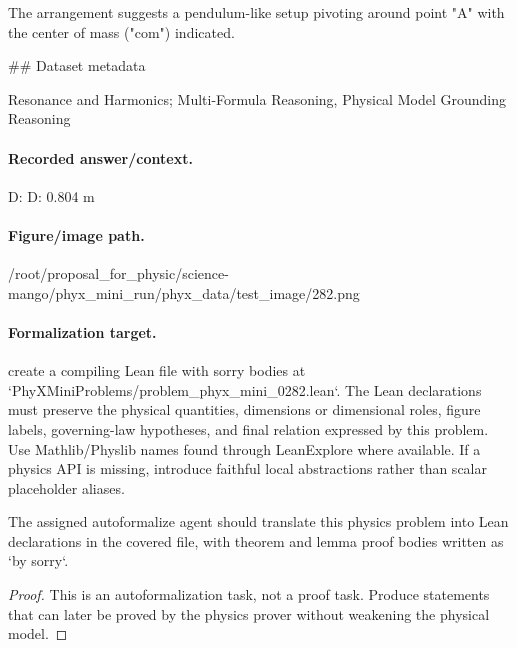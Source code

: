 The arrangement suggests a pendulum-like setup pivoting around point "A" with the center of mass ("com") indicated.

\#\# Dataset metadata

Resonance and Harmonics; Multi-Formula Reasoning, Physical Model Grounding Reasoning

\paragraph{Recorded answer/context.}
D: D: 0.804 m

\paragraph{Figure/image path.}
/root/proposal\_for\_physic/science-mango/phyx\_mini\_run/phyx\_data/test\_image/282.png

\paragraph{Formalization target.}
create a compiling Lean file with sorry bodies at `PhyXMiniProblems/problem\_phyx\_mini\_0282.lean`. The Lean declarations must preserve the physical quantities, dimensions or dimensional roles, figure labels, governing-law hypotheses, and final relation expressed by this problem.
Use Mathlib/Physlib names found through LeanExplore where available. If a physics API is missing, introduce faithful local abstractions rather than scalar placeholder aliases.

\begin{theorem}
\label{thm:physics:phyx_mini_0282:target}
The assigned autoformalize agent should translate this physics problem into Lean declarations in the covered file, with theorem and lemma proof bodies written as `by sorry`.
\end{theorem}
\begin{proof}
This is an autoformalization task, not a proof task. Produce statements that can later be proved by the physics prover without weakening the physical model.
\end{proof}


